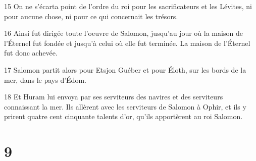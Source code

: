 \par 15 On ne s'écarta point de l'ordre du roi pour les sacrificateurs et les Lévites, ni pour aucune chose, ni pour ce qui concernait les trésors.
\par 16 Ainsi fut dirigée toute l'oeuvre de Salomon, jusqu'au jour où la maison de l'Éternel fut fondée et jusqu'à celui où elle fut terminée. La maison de l'Éternel fut donc achevée.
\par 17 Salomon partit alors pour Etsjon Guéber et pour Éloth, sur les bords de la mer, dans le pays d'Édom.
\par 18 Et Huram lui envoya par ses serviteurs des navires et des serviteurs connaissant la mer. Ils allèrent avec les serviteurs de Salomon à Ophir, et ils y prirent quatre cent cinquante talents d'or, qu'ils apportèrent au roi Salomon.

\chapter{9}

